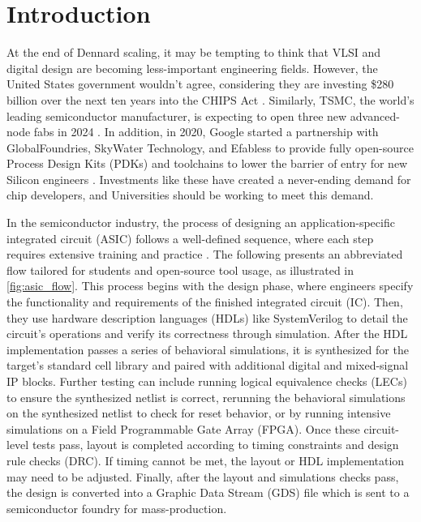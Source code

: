 
\chapter{Introduction}
\label{chapter:introduction}

At the end of Dennard scaling, it may be tempting to think that VLSI and digital design are becoming less-important engineering fields. However, the United States government wouldn't agree, considering they are investing \$280 billion over the next ten years into the CHIPS Act \cite{mckinsey}. Similarly, TSMC, the world's leading semiconductor manufacturer, is expecting to open three new advanced-node fabs in 2024 \cite{taipeitimes}. In addition, in 2020, Google started a partnership with GlobalFoundries, SkyWater Technology, and Efabless to provide fully open-source Process Design Kits (PDKs) and toolchains to lower the barrier of entry for new Silicon engineers \cite{GooglePartnersWithSkyWater, googleSilicon}. Investments like these have created a never-ending demand for chip developers, and Universities should be working to meet this demand.



In the semiconductor industry, the process of designing an application-specific integrated circuit (ASIC) follows a well-defined sequence, where each step requires extensive training and practice \cite{intelDesignFlow, anysiliconDesignFlow, kynixDesignFlow}. The following presents an abbreviated flow tailored for students and open-source tool usage, as illustrated in \autoref{fig:asic_flow}. This process begins with the design phase, where engineers specify the functionality and requirements of the finished integrated circuit (IC). Then, they use hardware description languages (HDLs) like SystemVerilog to detail the circuit's operations and verify its correctness through simulation. After the HDL implementation passes a series of behavioral simulations, it is synthesized for the target's standard cell library and paired with additional digital and mixed-signal IP blocks. Further testing can include running logical equivalence checks (LECs) to ensure the synthesized netlist is correct, rerunning the behavioral simulations on the synthesized netlist to check for reset behavior, or by running intensive simulations on a Field Programmable Gate Array (FPGA). Once these circuit-level tests pass, layout is completed according to timing constraints and design rule checks (DRC). If timing cannot be met, the layout or HDL implementation may need to be adjusted. Finally, after the layout and simulations checks pass, the design is converted into a Graphic Data Stream (GDS) file which is sent to a semiconductor foundry for mass-production.

